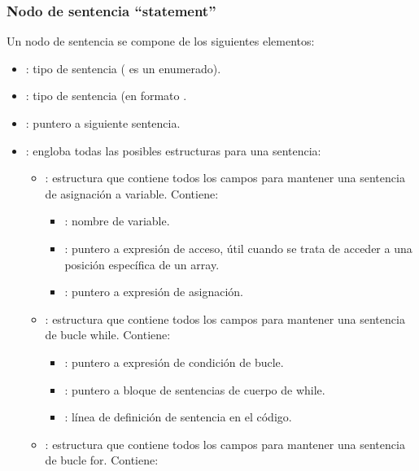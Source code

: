 \subsubsection{Nodo de sentencia ``statement''}
\noindent
Un nodo de sentencia se compone de los siguientes elementos:
\begin{itemize}
    \item {} : tipo de sentencia ( es un enumerado).
    \item {} : tipo de sentencia (en formato .
    \item {} : puntero a siguiente sentencia.
    \item {} : engloba todas las posibles estructuras para una sentencia:
    \begin{itemize}
        \item {} : estructura que contiene todos los campos para mantener una sentencia de asignación a variable. Contiene:
        \begin{itemize}
            \item {}: nombre de variable.
            \item {}: puntero a expresión de acceso, útil cuando se trata de acceder a una posición específica de un array.
            \item {}: puntero a expresión de asignación.
        \end{itemize}
    \end{itemize}
    \begin{itemize}
        \item {} : estructura que contiene todos los campos para mantener una sentencia de bucle while. Contiene:
        \begin{itemize}
            \item {}: puntero a expresión de condición de bucle.
            \item {}: puntero a bloque de sentencias de cuerpo de while.
            \item {} : línea de definición de sentencia en el código.
        \end{itemize}
    \end{itemize}
    \begin{itemize}
        \item {} : estructura que contiene todos los campos para mantener una sentencia de bucle for. Contiene:

\end{itemize}
\end{itemize}
